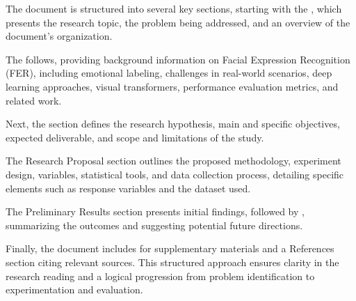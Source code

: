 The document is structured into several key sections, starting with the
, which presents the research topic, the problem being addressed, and an
overview of the document’s organization. 

The  follows,
providing background information on Facial Expression Recognition (FER), including emotional labeling, challenges in real-world scenarios, deep learning approaches, visual transformers, performance evaluation metrics, and related work. 

Next, the  section defines the research hypothesis, main and specific objectives, expected deliverable, and scope and limitations of the study.

The Research Proposal section outlines the proposed methodology, experiment design, variables, statistical tools, and data collection process, detailing specific
elements such as response variables and the dataset used. 

The Preliminary Results section presents initial findings, followed by ,
summarizing the outcomes and suggesting potential future directions. 

Finally, the document includes  for supplementary materials and a References section citing relevant sources. This structured approach ensures clarity in the research reading and a logical progression from problem identification to experimentation and evaluation. 

